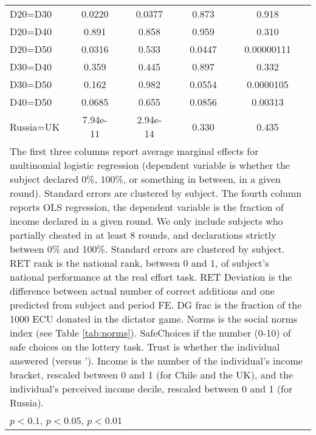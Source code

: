 \begin{tabular}{l|cccccc|cc}
D20=D30         &   0.0220         &         &   0.0377         &         &    0.873         &         &    0.918         &         \\
D20=D40         &    0.891         &         &    0.858         &         &    0.959         &         &    0.310         &         \\
D20=D50         &   0.0316         &         &    0.533         &         &   0.0447         &         &0.00000111         &         \\
D30=D40         &    0.359         &         &    0.445         &         &    0.897         &         &    0.332         &         \\
D30=D50         &    0.162         &         &    0.982         &         &   0.0554         &         &0.0000105         &         \\
D40=D50         &   0.0685         &         &    0.655         &         &   0.0856         &         &  0.00313         &         \\
Russia=UK       & 7.94e-11         &         & 2.94e-14         &         &    0.330         &         &    0.435         &         \\
\hline\hline
\multicolumn{9}{p{16cm}}{\tiny The first three columns report average marginal effects for multinomial logistic regression (dependent variable is whether the subject declared 0\%, 100\%, or something in between, in a given round). Standard errors are clustered by subject. The fourth column reports OLS regression, the dependent variable is the fraction of income declared in a given round. We only include subjects who partially cheated in at least 8 rounds, and declarations strictly between 0\% and 100\%. Standard errors are clustered by subject. RET rank is the national rank, between 0 and 1, of subject's national performance at the real effort task. RET Deviation is the difference between actual number of correct additions and one predicted from subject and period FE. DG frac is the fraction of the 1000 ECU donated in the dictator game. Norms is the social norms index (see Table \ref{tab:norms}). SafeChoices if the number (0-10) of safe choices on the lottery task. Trust is whether the individual answered  (versus '). Income is the number of the individual's income bracket, rescaled between 0 and 1 (for Chile and the UK), and the individual's perceived income decile, rescaled between 0 and 1 (for Russia).}\\
\multicolumn{9}{l}{\tiny \sym{*} \(p<0.1\), \sym{**} \(p<0.05\), \sym{***} \(p<0.01\)}\\
\end{tabular}
